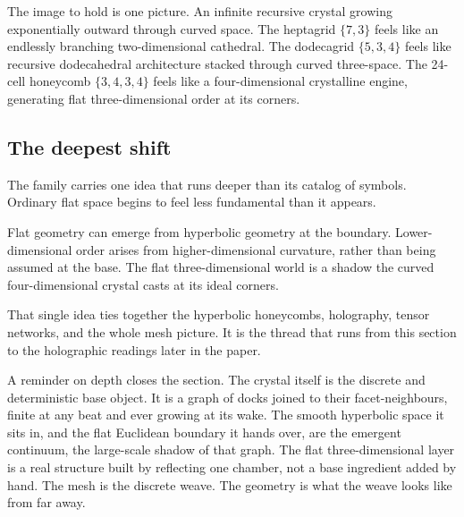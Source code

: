 The image to hold is one picture. An infinite recursive crystal growing exponentially outward through curved space. The heptagrid $\{7,3\}$ feels like an endlessly branching two-dimensional cathedral. The dodecagrid $\{5,3,4\}$ feels like recursive dodecahedral architecture stacked through curved three-space. The 24-cell honeycomb $\{3,4,3,4\}$ feels like a four-dimensional crystalline engine, generating flat three-dimensional order at its corners.

\subsection{The deepest shift}

The family carries one idea that runs deeper than its catalog of symbols. Ordinary flat space begins to feel less fundamental than it appears.

\begin{result}
Flat geometry can emerge from hyperbolic geometry at the boundary. Lower-dimensional order arises from higher-dimensional curvature, rather than being assumed at the base. The flat three-dimensional world is a shadow the curved four-dimensional crystal casts at its ideal corners.
\end{result}

That single idea ties together the hyperbolic honeycombs, holography, tensor networks, and the whole mesh picture. It is the thread that runs from this section to the holographic readings later in the paper.

A reminder on depth closes the section. The crystal itself is the discrete and deterministic base object. It is a graph of docks joined to their facet-neighbours, finite at any beat and ever growing at its wake. The smooth hyperbolic space it sits in, and the flat Euclidean boundary it hands over, are the emergent continuum, the large-scale shadow of that graph. The flat three-dimensional layer is a real structure built by reflecting one chamber, not a base ingredient added by hand. The mesh is the discrete weave. The geometry is what the weave looks like from far away.
